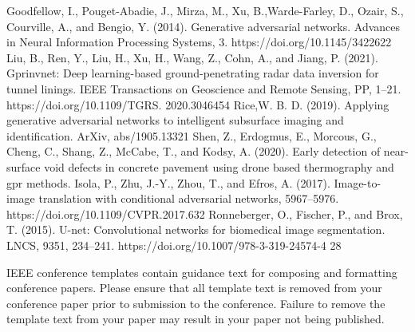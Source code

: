\documentclass[conference]{IEEEtran}
\begin{document}
\begin{thebibliography}{00}
 Goodfellow, I., Pouget-Abadie, J., Mirza, M., Xu, B.,Warde-Farley, D., Ozair, S., Courville, A., and Bengio, Y. (2014). Generative adversarial networks. Advances in Neural Information Processing Systems, 3. https://doi.org/10.1145/3422622
 Liu, B., Ren, Y., Liu, H., Xu, H., Wang, Z., Cohn, A., and Jiang, P. (2021). Gprinvnet: Deep learning-based ground-penetrating radar data inversion for tunnel linings. IEEE Transactions on Geoscience and Remote Sensing, PP, 1–21. https://doi.org/10.1109/TGRS. 2020.3046454
 Rice,W. B. D. (2019). Applying generative adversarial networks to intelligent subsurface imaging and identification. ArXiv, abs/1905.13321
 Shen, Z., Erdogmus, E., Morcous, G., Cheng, C., Shang, Z., McCabe, T., and Kodsy, A. (2020). Early detection of near-surface void defects in concrete pavement using drone based thermography and gpr methods.
 Isola, P., Zhu, J.-Y., Zhou, T., and Efros, A. (2017). Image-to-image translation with conditional adversarial networks, 5967–5976. https://doi.org/10.1109/CVPR.2017.632
 Ronneberger, O., Fischer, P., and Brox, T. (2015). U-net: Convolutional networks for biomedical image segmentation. LNCS, 9351, 234–241. https://doi.org/10.1007/978-3-319-24574-4 28
\end{thebibliography}
\vspace{12pt}
\color{red}
IEEE conference templates contain guidance text for composing and formatting conference papers. Please ensure that all template text is removed from your conference paper prior to submission to the conference. Failure to remove the template text from your paper may result in your paper not being published.
\end{document}
